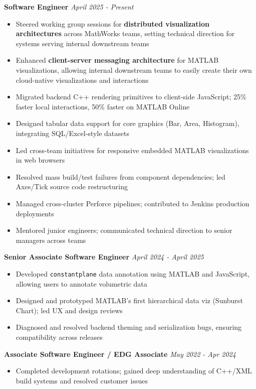 \documentclass{article}
\begin{document}
{\large \textbf{Software Engineer}} \hfill \textit{April 2025 - Present}
\begin{itemize}[leftmargin=*]
    \item Steered working group sessions for \textbf{distributed visualization architectures} across MathWorks teams, setting technical direction for systems serving internal downstream teams
    \item Enhanced \textbf{client-server messaging architecture} for MATLAB visualizations, allowing internal downstream teams to easily create their own cloud-native visualizations and interactions
    \item Migrated backend C++ rendering primitives to client-side JavaScript; 25\% faster local interactions, 50\% faster on MATLAB Online
    \item Designed tabular data support for core graphics (Bar, Area, Histogram), integrating SQL/Excel-style datasets
    \item Led cross-team initiatives for responsive embedded MATLAB visualizations in web browsers
    \item Resolved mass build/test failures from component dependencies; led Axes/Tick source code restructuring
    \item Managed cross-cluster Perforce pipelines; contributed to Jenkins production deployments
    \item Mentored junior engineers; communicated technical direction to senior managers across teams
\end{itemize}

{\large \textbf{Senior Associate Software Engineer}} \hfill \textit{April 2024 - April 2025}
\begin{itemize}[leftmargin=*]
    \item Developed \texttt{constantplane} data annotation using MATLAB and JavaScript, allowing users to annotate volumetric data
    \item Designed and prototyped MATLAB's first hierarchical data viz (Sunburst Chart); led UX and design reviews
    \item Diagnosed and resolved backend theming and serialization bugs, ensuring compatibility across releases
\end{itemize}

{\large \textbf{Associate Software Engineer / EDG Associate}} \hfill \textit{May 2022 - Apr 2024}
\begin{itemize}[leftmargin=*]
    \item Completed development rotations; gained deep understanding of C++/XML build systems and resolved customer issues
\end{itemize}
\end{document}
